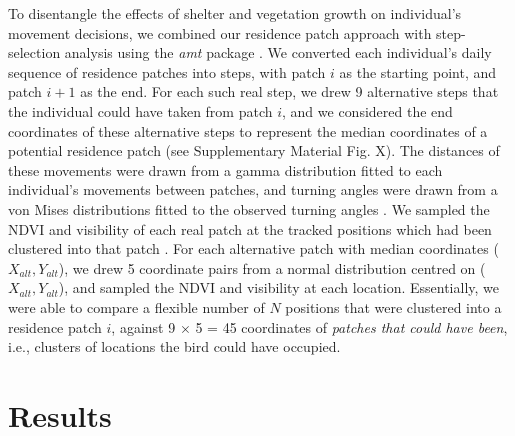 To disentangle the effects of shelter and vegetation growth on individual's movement decisions, we combined our residence patch approach with step-selection analysis \citep{thurfjell2014,avgar2016} using the \textit{amt} package \citep{signer2019}.
We converted each individual's daily sequence of residence patches into steps, with patch $i$ as the starting point, and patch $i+1$ as the end.
For each such real step, we drew 9 alternative steps that the individual could have taken from patch $i$, and we considered the end coordinates of these alternative steps to represent the median coordinates of a potential residence patch (see Supplementary Material Fig. X).
The distances of these movements were drawn from a gamma distribution fitted to each individual's movements between patches, and turning angles were drawn from a von Mises distributions fitted to the observed turning angles \citep{signer2019}.
We sampled the NDVI and visibility of each real patch at the tracked positions which had been clustered into that patch \citep{gupte2021b}.
For each alternative patch with median coordinates ($X_{alt}, Y_{alt}$), we drew 5 coordinate pairs from a normal distribution centred on ($X_{alt}, Y_{alt}$), and sampled the NDVI and visibility at each location.
Essentially, we were able to compare a flexible number of $N$ positions that were clustered into a residence patch $i$, against 9 $ \times$ 5 = 45 coordinates of \textit{patches that could have been}, i.e., clusters of locations the bird could have occupied.

\section*{Results}

